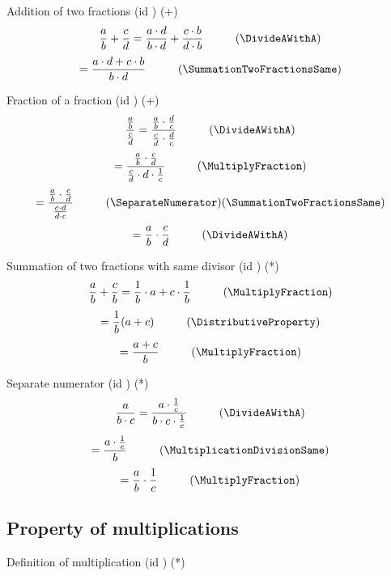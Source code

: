 \documentclass{book}
\begin{document}
                Addition of two fractions (id \AdditionTwoFractions) (+)
                \[\frac{a}{b} + \frac{c}{d} = \frac{a \cdot d}{b \cdot d} + \frac{c \cdot b}{d \cdot b} \hspace{1cm} (\DivideAWithA)\]
                \[= \frac{a \cdot d + c \cdot b}{b \cdot d} \hspace{1cm} (\SummationTwoFractionsSame)\]

                Fraction of a fraction (id \FractionOfFraction) (+)
                \[\frac{\frac{a}{b}}{\frac{c}{d}} = \frac{\frac{a}{b} \cdot \frac{d}{c}}{\frac{c}{d} \cdot \frac{d}{c}} \hspace{1cm} (\DivideAWithA)\]
                \[= \frac{\frac{a}{b} \cdot \frac{c}{d}}{\frac{c}{d} \cdot d \cdot \frac{1}{c}} \hspace{1cm} (\MultiplyFraction)\]
                \[= \frac{\frac{a}{b} \cdot \frac{c}{d}}{\frac{c \cdot d}{d \cdot c}} \hspace{1cm} (\SeparateNumerator) (\SummationTwoFractionsSame)\]
                \[= \frac{a}{b} \cdot \frac{c}{d} \hspace{1cm} (\DivideAWithA)\]

                Summation of two fractions with same divisor (id \SummationTwoFractionsSame) (*)
                \[\frac{a}{b} + \frac{c}{b} = \frac{1}{b} \cdot a + c \cdot \frac{1}{b} \hspace{1cm} (\MultiplyFraction)\]
                \[= \frac{1}{b} (a + c) \hspace{1cm} (\DistributiveProperty)\]
                \[= \frac{a + c}{b} \hspace{1cm} (\MultiplyFraction)\]

                Separate numerator (id \SeparateNumerator) (*)
                \[\frac{a}{b \cdot c} = \frac{a \cdot \frac{1}{c}}{b \cdot c \cdot \frac{1}{c}} \hspace{1cm} (\DivideAWithA)\]
                \[= \frac{a \cdot \frac{1}{c}}{b} \hspace{1cm} (\MultiplicationDivisionSame)\]
                \[= \frac{a}{b} \cdot \frac{1}{c} \hspace{1cm} (\MultiplyFraction)\]

            \subsection{Property of multiplications}
                Definition of multiplication (id \DefinitionMultiplication) (*)\\
                
\end{document}

